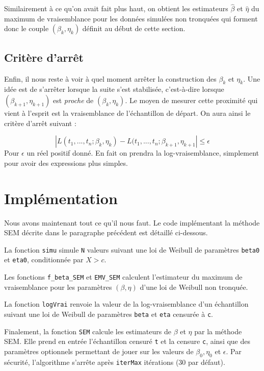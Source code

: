 \documentclass[a4paper]{report}
\begin{document}
Similairement à ce qu'on avait fait plus haut, on obtient les estimateurs $\hat{\beta}$ et $\hat{\eta}$ du maximum de vraisemblance pour les données simulées non tronquées qui forment donc le couple $(\beta_k,\eta_k)$ définit au début de cette section. 


\subsection{Critère d'arrêt}

Enfin, il nous reste à voir à quel moment arrêter la construction des $\beta_k$ et $\eta_k$. 
Une idée est de s'arrêter lorsque la suite s'est stabilisée, c'est-à-dire lorsque $(\beta_{k+1},\eta_{k+1})$ est \emph{proche} de $(\beta_k,\eta_k)$. Le moyen de mesurer cette proximité qui vient à l'esprit est la vraisemblance de l'échantillon de départ. On aura ainsi le critère d'arrêt suivant : 

\[ | L(t_1,...,t_n;\beta_k,\eta_k) - L(t_1,...,t_n;\beta_{k+1},\eta_{k+1} | \leq \epsilon \]
Pour $\epsilon$ un réel positif donné. En fait on prendra la log-vraisemblance, simplement pour
avoir des expressions plus simples.

\section{Implémentation \label{sec:impl2}}

Nous avons maintenant tout ce qu'il nous faut. Le code implémentant la méthode SEM décrite dans le paragraphe précédent est détaillé ci-dessous.

La fonction \verb|simu| simule \verb|N| valeurs suivant une loi de Weibull de paramètres \verb|beta0| et \verb|eta0|, conditionnée par $X>c$.



Les fonctions \verb|f_beta_SEM| et \verb|EMV_SEM| calculent l'estimateur du maximum de vraisemblance pour les paramètres $(\beta,\eta)$ d'une loi de Weibull non tronquée. 


La fonction \verb|logVrai| renvoie la valeur de la log-vraisemblance d'un échantillon suivant une loi de Weibull de paramètres \verb|beta| et \verb|eta| censurée à \verb|c|.


Finalement, la fonction \verb|SEM| calcule les estimateurs de $\beta$ et $\eta$ par la méthode SEM. Elle prend en entrée l'échantillon censuré \verb|t| et la censure \verb|c|, ainsi que des paramètres optionnels permettant de jouer sur les valeurs de $\beta_0, \eta_0$ et $\epsilon$. Par sécurité, l'algorithme s'arrête après \verb|iterMax| itérations (30 par défaut).
 
 
\end{document}
